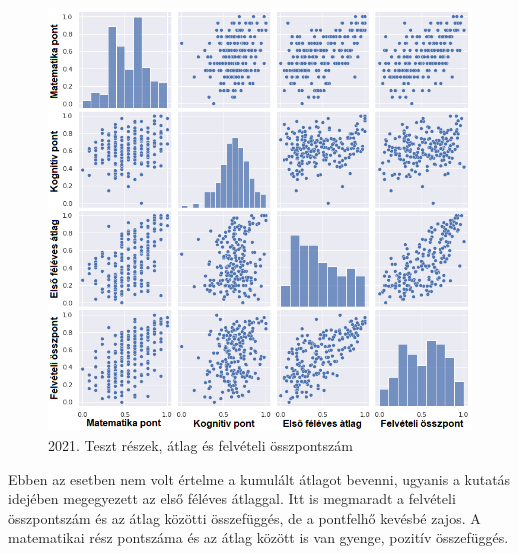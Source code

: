 \documentclass[12pt]{article}
\begin{document}
\begin{figure}[H]
\centering
\includegraphics[width=\textwidth]{kepek/2021minmax.png}
\caption{2021. Teszt részek, átlag és felvételi összpontszám}
\label{fig:2021minmax}
\end{figure}

Ebben az esetben nem volt értelme a kumulált átlagot bevenni, ugyanis a kutatás idejében megegyezett az első féléves átlaggal. Itt is megmaradt a felvételi összpontszám és az átlag közötti összefüggés, de a pontfelhő kevésbé zajos. A matematikai rész pontszáma és az átlag között is van gyenge, pozitív összefüggés.
\end{document}
